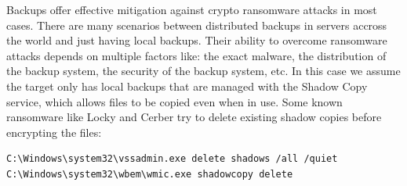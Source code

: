 \linej
\linej
Backups offer effective mitigation against crypto ransomware attacks in most cases.
There are many scenarios between distributed backups in servers accross the world and just having local backups.
Their ability to overcome ransomware attacks depends on multiple factors like: the exact malware, the distribution of the backup system, the security of the backup system, etc.
\linej
In this case we assume the target only has local backups that are managed with the Shadow Copy service, which allows files to be copied even when in use.
Some known ransomware like Locky and Cerber try to delete existing shadow copies before encrypting the files\cite{ransomware_oReilly}:
\begin{lstlisting}[style=PS]
C:\Windows\system32\vssadmin.exe delete shadows /all /quiet
C:\Windows\system32\wbem\wmic.exe shadowcopy delete
\end{lstlisting}
\linej


